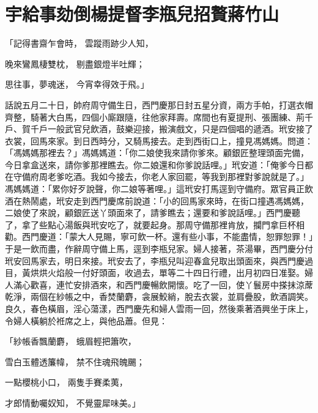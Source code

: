 %

\chapter{宇給事劾倒楊提督\KG 李瓶兒招贅蔣竹山}

「記得書齋乍會時，  雲蹤雨跡少人知，

晚來鸞鳳棲雙枕，  剔盡銀燈半吐輝；

思往事，夢魂迷，  今宵幸得效于飛。」

話說五月二十日，帥府周守備生日，西門慶那日封五星分資，兩方手帕，打選衣帽齊整，騎著大白馬，四個小廝跟隨，往他家拜壽。席間也有夏提刑、張團練、荊千戶、賀千戶一般武官兒飲酒，鼓樂迎接，搬演戲文，只是四個唱的遞酒。玳安接了衣裳，回馬來家。到日西時分，又騎馬接去。走到西街口上，撞見馮媽媽。問道：「馮媽媽那裡去？」馮媽媽道：「你二娘使我來請你爹來。顧銀匠整理頭面完備，今日拿盒送來，請你爹那裡瞧去。你二娘還和你爹說話哩。」玳安道：「俺爹今日都在守備府周老爹吃酒。我如今接去，你老人家回罷，等我到那裡對爹說就是了。」馮媽媽道：「累你好歹說聲，你二娘等著哩。」這玳安打馬逕到守備府。眾官員正飲酒在熱鬧處，玳安走到西門慶席前說道：「小的回馬家來時，在街口撞遇馮媽媽，二娘使了來說，顧銀匠送丫頭面來了，請爹瞧去；還要和爹說話哩。」西門慶聽了，拿了些點心湯飯與玳安吃了，就要起身。那周守備那裡肯放，攔門拿巨杯相勸。西門慶道：「蒙大人見賜，寧可飲一杯。還有些小事，不能盡情，恕罪恕罪！」于是一飲而盡，作辭周守備上馬，逕到李瓶兒家。婦人接著，茶湯畢，西門慶分付玳安回馬家去，明日來接。玳安去了，李瓶兒叫迎春盒兒取出頭面來，與西門慶過目，黃烘烘火焰般一付好頭面，收過去，單等二十四日行禮，出月初四日准娶。婦人滿心歡喜，連忙安排酒來，和西門慶暢飲開懷。吃了一回，使丫鬟房中搽抹涼蓆乾淨，兩個在紗帳之中，香焚蘭麝，衾展鮫綃，脫去衣裳，並肩疊股，飲酒調笑。良久，春色橫眉，淫心蕩漾，西門慶先和婦人雲雨一回，然後乘著酒興坐于床上，令婦人橫躺於袵席之上，與他品蕭。但見：

「紗帳香飄蘭麝，  蛾眉輕把簫吹，

雪白玉體透簾幃，  禁不住魂飛魄颺；

一點櫻桃小口，  兩隻手賽柔荑，

才郎情動囑奴知，  不覺靈犀味美。」

